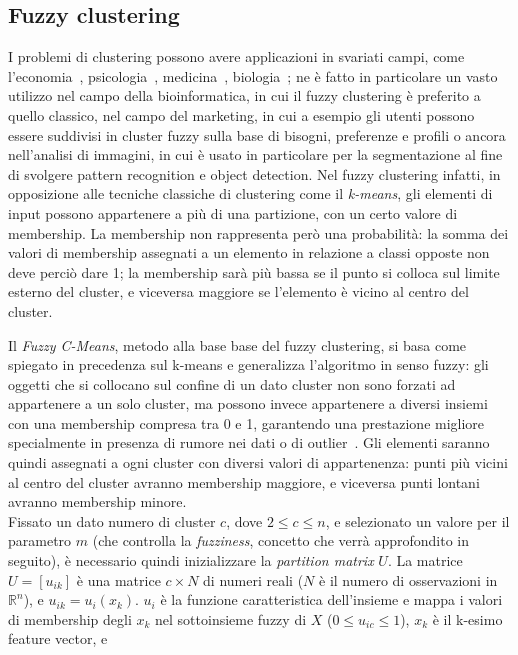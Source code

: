 \documentclass[oneside, openany]{book}
\begin{document}
	\subsection{Fuzzy clustering}
		I problemi di clustering possono avere applicazioni in svariati campi, come l'economia~\cite{bib:economy}, psicologia~\cite{bib:psychology}, medicina~\cite{bib:medicine, bib:medicine2}, biologia~\cite{bib:biology,bib:biology2}; ne è fatto in particolare un vasto utilizzo nel campo della bioinformatica, in cui il fuzzy clustering è preferito a quello classico, nel campo del marketing, in cui a esempio gli utenti possono essere suddivisi in cluster fuzzy sulla base di bisogni, preferenze e profili o ancora nell'analisi di immagini, in cui è usato in particolare per la segmentazione al fine di svolgere pattern recognition e object detection.
		Nel fuzzy clustering infatti, in opposizione alle tecniche classiche di clustering come il \textit{k-means}, gli elementi di input possono appartenere a più di una partizione, con un certo valore di membership. La membership non rappresenta però una probabilità: la somma dei valori di membership assegnati a un elemento in relazione a classi opposte non deve perciò dare 1; la membership sarà più bassa se il punto si colloca sul limite esterno del cluster, e viceversa maggiore se l'elemento è vicino al centro del cluster.
		
		Il \textit{Fuzzy C-Means}, metodo alla base base del fuzzy clustering, si basa come spiegato in precedenza sul k-means e generalizza l'algoritmo in senso fuzzy: gli oggetti che si collocano sul confine di un dato cluster non sono forzati ad appartenere a un solo cluster, ma possono invece appartenere a diversi insiemi con una membership compresa tra 0 e 1, garantendo una prestazione migliore specialmente in presenza di rumore nei dati o di outlier~\cite{bib:kmvfcm}. 
		Gli elementi saranno quindi assegnati a ogni cluster con diversi valori di appartenenza: punti più vicini al centro del cluster avranno membership maggiore, e viceversa punti lontani avranno membership minore.\\
		Fissato un dato numero di cluster $c$, dove $2\leq c \le n$,  e selezionato un valore per il parametro $m$ (che controlla la \textit{fuzziness}, concetto che verrà approfondito in seguito), è necessario quindi inizializzare la \textit{partition matrix} $U$. La matrice $U=[u_{ik}]$ è una matrice $c\times N$ di numeri reali ($N$ è il numero di osservazioni in $\mathbb R^n$), e $u_{ik}=u_i(x_k)$. $u_{i}$ è la funzione caratteristica dell'insieme e mappa i valori di membership degli $x_k$ nel sottoinsieme fuzzy di $X$ ($0\leq u_{ic}\leq 1$), $x_k$ è il k-esimo feature vector, e
	
\end{document}
